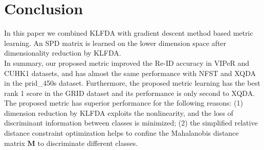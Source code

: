\documentclass[10pt,twocolumn,letterpaper]{article}
\begin{document}
\section{Conclusion}
In this paper we combined KLFDA with gradient descent method based metric learning. An SPD matrix is learned on the lower dimension space after dimensionality reduction by KLFDA. \\
\indent In summary, our proposed metric improved the Re-ID accuracy in VIPeR and CUHK1 datasets, and has almost the same performance with NFST and XQDA in the prid\_450s dataset. Furthermore, the proposed metric learning has the best rank 1 score in the GRID dataset and its performance is only second to XQDA. The proposed metric has superior performance for the following reasons: (1) dimension reduction by KLFDA exploits the nonlinearity, and the loss of discriminant information between classes is minimized; (2) the simplified relative distance constraint optimization helps to confine the Mahalanobis distance matrix $\bm{M}$ to discriminate different classes.
\end{document}

